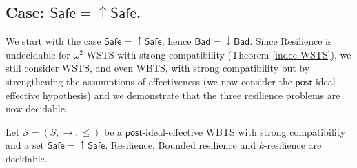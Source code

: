 \documentclass[runningheads]{llncs}
\newcommand{\alain}[1]{\todo[inline,color=red!20]{{\bf AF:} #1}}
\newcommand{\post}{\textsf{post}}
\newcommand{\Bad}{\textsf{Bad}}
\newcommand{\Safe}{\textsf{Safe}}
\begin{document}
\subsection{Case: $\Safe=\mathop{\uparrow} \Safe$.}\label{safe-up}

We start with the case $\Safe=\mathop{\uparrow} \Safe$, hence $\Bad=\mathop{\downarrow} \Bad$.
Since Resilience is undecidable for  $\omega^2$-WSTS with strong compatibility (Theorem \ref{indec WSTS}), we still consider WSTS, and even WBTS, with strong compatibility but by strengthening the assumptions of effectiveness (we now consider the $\post$-ideal-effective hypothesis) and we demonstrate that the three resilience problems are now decidable.




%
\begin{theorem}\label{down-up}
Let $\mathscr{S}=(S,\rightarrow, \leq)$ be a $\post$-ideal-effective WBTS with strong compatibility and a set $\Safe = \mathop{\uparrow} \Safe$.
{\sc Resilience}, {\sc Bounded resilience} 
and {\sc $k$-resilience} are decidable.
\end{theorem}

\end{document}
